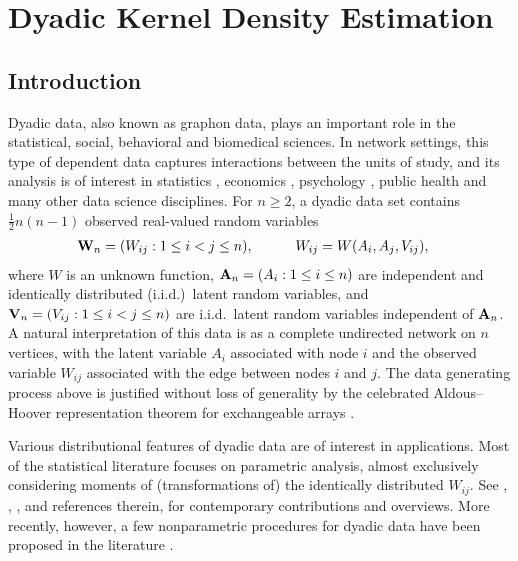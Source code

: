 \chapter{Dyadic Kernel Density Estimation}

\section{Introduction}
\label{sec:introduction}

Dyadic data, also known as graphon data,
plays an important role in the statistical, social,
behavioral and biomedical sciences.
In network settings,
this type of dependent data captures
interactions between the units of study,
and its analysis is
of interest in statistics \citep{kolaczyk2009statistical}, economics
\citep{graham2020network}, psychology \citep{kenny2020dyadic}, public health
\citep{luke2007network} and many other data science disciplines.
For $n \geq 2$, a dyadic data set contains
$\frac{1}{2}n(n-1)$
observed real-valued random variables
%
\begin{align*}
  \mathbf{W}_n = (W_{ij}:1\leq i<j \leq n),
  \quad\qquad W_{ij}
  &= W(A_i,A_j,V_{ij}),
\end{align*}
%
where $W$ is an unknown function, $\mathbf{A}_n=(A_{i}:1\leq i \leq n)$
are independent and identically distributed (i.i.d.)\ latent random variables,
and $\mathbf{V}_n=(V_{ij}:1\leq i<j \leq n)$ are i.i.d.\
latent random variables independent of $\mathbf{A}_n$.
A natural interpretation of
this data is as a complete
undirected network on $n$ vertices,
with the latent variable $A_i$ associated with node $i$
and the observed variable $W_{ij}$ associated
with the edge between nodes $i$ and $j$.
The data generating process above is justified
without loss of generality by the celebrated
Aldous--Hoover representation theorem
for exchangeable arrays
\citep{aldous1981representations, hoover1979relations}.

Various distributional features of dyadic data are of interest in applications.
Most of the statistical literature focuses on parametric analysis, almost
exclusively considering moments of (transformations of)
the identically distributed $W_{ij}$.
See \citet{davezies2021exchangeable}, \citet{gao2021minimax},
\citet{MatsushitaOtsu2021}, and references therein, for contemporary
contributions and overviews. More recently, however, a few nonparametric
procedures for dyadic data have been proposed in the literature
\citep{graham2021dyadicregression,graham2022kernel}.

